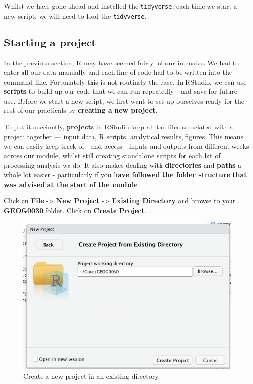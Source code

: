 \documentclass[
]{book}
\begin{document}
Whilst we have gone ahead and installed the \texttt{tidyverse}, each time we start a new script, we will need to load the \texttt{tidyverse}.

\hypertarget{starting-a-project}{%
\subsection{Starting a project}\label{starting-a-project}}

In the previous section, R may have seemed fairly labour-intensive. We had to enter all our data manually and each line of code had to be written into the command line. Fortunately this is not routinely the case. In RStudio, we can use \textbf{scripts} to build up our code that we can run repeatedly - and save for future use. Before we start a new script, we first want to set up ourselves ready for the rest of our practicals by \textbf{creating a new project}.

To put it succinctly, \textbf{projects} in RStudio keep all the files associated with a project together --- input data, R scripts, analytical results, figures. This means we can easily keep track of - and access - inputs and outputs from different weeks across our module, whilst still creating standalone scripts for each bit of processing analysis we do. It also makes dealing with \textbf{directories} and \textbf{paths} a whole lot easier - particularly if you \textbf{have followed the folder structure that was advised at the start of the module}.

Click on \textbf{File} -\textgreater{} \textbf{New Project} -\textgreater{} \textbf{Existing Directory} and browse to your \textbf{GEOG0030} folder. Click on \textbf{Create Project}.

\begin{figure}

{\centering \includegraphics[width=19.03in]{images/w04/new-project} 

}

\caption{Create a new project in an existing directory.}\label{fig:04-new-project}
\end{figure}
\end{document}
